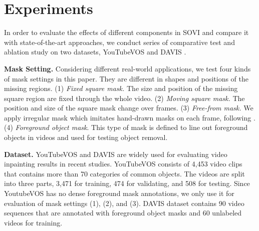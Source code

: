 


\section{Experiments}

In order to evaluate the effects of different components in SOVI and compare it with state-of-the-art approaches, we conduct series of comparative test and ablation study on two datasets, YouTubeVOS \cite{xu2018Youtube} and DAVIS \cite{davis_2017}.

\noindent \textbf{Mask Setting.} Considering different real-world applications, we test four kinds of mask settings in this paper. 
They are different in shapes and positions of the missing regions. 
(1) \emph{Fixed square mask.} The size and position of the missing square region are fixed through the whole video. 
(2) \emph{Moving square mask.} The position and size of the square mask change over frames. 
(3) \emph{Free-from mask.} We apply irregular mask which imitates hand-drawn masks on each frame, following \cite{liu2018partialinpainting}. 
(4) \emph{Foreground object mask}. This type of mask is defined to line out foreground objects in videos and used for testing object removal.

\noindent\textbf{Dataset.} 
YouTubeVOS and DAVIS are widely used for evaluating video inpainting results in recent studies.
YouTubeVOS consists of 4,453 video clips that contains more than 70 categories of common objects. 
The videos are split into three parts, 3,471 for training, 474 for validating, and 508 for testing. Since YoutubeVOS has no dense foreground mask annotations, we only use it for evaluation of mask settings (1), (2), and (3). 
% 
DAVIS dataset contains 90 video sequences that are annotated with foreground object masks and 60 unlabeled videos for training.



